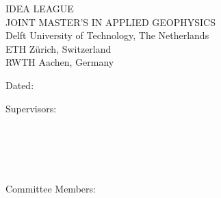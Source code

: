 \thispagestyle{empty}
\vspace*{8em}
\begin{center}
  {\large IDEA LEAGUE}\\
  {\large JOINT MASTER'S IN APPLIED GEOPHYSICS}\\[3em]
  Delft University of Technology, The Netherlands\\
  ETH Zürich, Switzerland\\
  RWTH Aachen, Germany
\end{center}

\vspace{2cm}
\mbox{}\hfill Dated: \textit{\mydate}
\vspace{2cm}

\noindent
Supervisors: \hfill \underline{\hspace{7cm}}\\
\mbox{}        \hfill \myreaderone\\[2em]
%
\mbox{}        \hfill \underline{\hspace{7cm}}\\
\mbox{}        \hfill \myreadertwo\\[2em]
%
\mbox{}        \hfill \underline{\hspace{7cm}}\\
\mbox{}        \hfill \myreaderthree\\[2em]
%
Committee Members: \hfill \underline{\hspace{7cm}}\\
\mbox{}            \hfill \myreaderone\\[1em]
%
\mbox{}            \hfill \underline{\hspace{7cm}}\\
\mbox{}            \hfill \myreadertwo\\[1em]
%
\mbox{}            \hfill \underline{\hspace{7cm}}\\
\mbox{}            \hfill \myreaderthree\\[1em]
%
\mbox{}            \hfill \underline{\hspace{7cm}}\\
\mbox{}            \hfill \myreaderfour

\cleardoublepage
